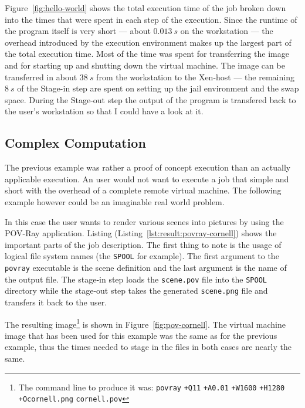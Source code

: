 Figure~\ref{fig:hello-world}  shows the  total execution  time of  the job
broken  down  into  the  times  that  were  spent  in  each  step  of  the
execution. Since the runtime of the program itself is very short --- about
$0.013\ s$ on the workstation --- the overhead introduced by the execution
environment makes up the largest part of the total execution time. Most of
the time  was spent  for transferring  the image and  for starting  up and
shutting down the  virtual machine. The image can  be transferred in about
$38\ s$ from  the workstation to the Xen-host --- the  remaining $8\ s$ of
the Stage-in  step are spent  on setting up  the jail environment  and the
swap  space.  During the  Stage-out  step the  output  of  the program  is
transfered back to  the user's workstation so that I could  have a look at
it.

\subsection{Complex Computation}
\label{sec:complex-example}

The  previous example  was rather  a proof  of concept  execution  than an
actually applicable  execution. An  user would not  want to execute  a job
that  simple and  short with  the overhead  of a  complete  remote virtual
machine. The following  example however could be an  imaginable real world
problem.

In this  case the  user wants  to render various  scenes into  pictures by
using     the      POV-Ray     \cite{POV-Ray}     application.      Listing
(Listing~\ref{lst:result:povray-cornell}) shows the important parts of the
job description.   The first thing  to note is  the usage of  logical file
system names (the \texttt{SPOOL} for  example).  The first argument to the
\texttt{povray} executable  is the scene definition and  the last argument
is  the   name  of  the  output   file.   The  stage-in   step  loads  the
\texttt{scene.pov}  file  into  the  \texttt{SPOOL}  directory  while  the
stage-out step  takes the generated \texttt{scene.png}  file and transfers
it back to the user.

The  resulting   image\footnote{The  command  line  to   produce  it  was:
  \texttt{povray}     \texttt{+Q11}     \texttt{+A0.01}    \texttt{+W1600}
  \texttt{+H1280} \texttt{+Ocornell.png} \texttt{cornell.pov}} is shown in
Figure~\ref{fig:pov-cornell}.   The virtual  machine image  that  has been
used for this  example was the same as for the  previous example, thus the
times needed to stage in the files in both cases are nearly the same.

